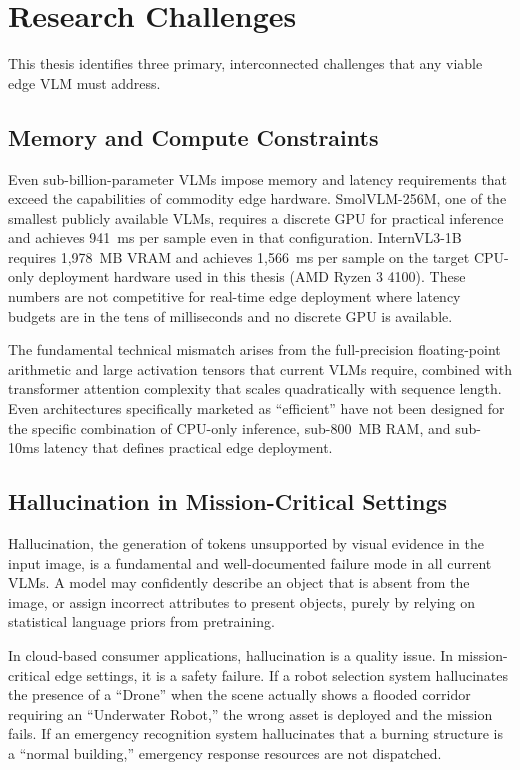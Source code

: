 \section{Research Challenges}
\label{sec:intro_challenges}

This thesis identifies three primary, interconnected challenges that any viable edge VLM must address.

\subsection{Memory and Compute Constraints}
\label{subsec:challenge_compute}

Even sub-billion-parameter VLMs impose memory and latency requirements that exceed the capabilities of commodity edge hardware. SmolVLM-256M, one of the smallest publicly available VLMs, requires a discrete GPU for practical inference and achieves 941~ms per sample even in that configuration. InternVL3-1B requires 1,978~MB VRAM and achieves 1,566~ms per sample on the target CPU-only deployment hardware used in this thesis (AMD Ryzen 3 4100). These numbers are not competitive for real-time edge deployment where latency budgets are in the tens of milliseconds and no discrete GPU is available.

The fundamental technical mismatch arises from the full-precision floating-point arithmetic and large activation tensors that current VLMs require, combined with transformer attention complexity that scales quadratically with sequence length. Even architectures specifically marketed as ``efficient'' have not been designed for the specific combination of CPU-only inference, sub-800~MB RAM, and sub-10ms latency that defines practical edge deployment.

\subsection[Hallucination at the Edge]{Hallucination in Mission-Critical Settings}
\label{subsec:challenge_hallucination}

Hallucination, the generation of tokens unsupported by visual evidence in the input image, is a fundamental and well-documented failure mode in all current VLMs. A model may confidently describe an object that is absent from the image, or assign incorrect attributes to present objects, purely by relying on statistical language priors from pretraining.

In cloud-based consumer applications, hallucination is a quality issue. In mission-critical edge settings, it is a safety failure. If a robot selection system hallucinates the presence of a ``Drone'' when the scene actually shows a flooded corridor requiring an ``Underwater Robot,'' the wrong asset is deployed and the mission fails. If an emergency recognition system hallucinates that a burning structure is a ``normal building,'' emergency response resources are not dispatched.

